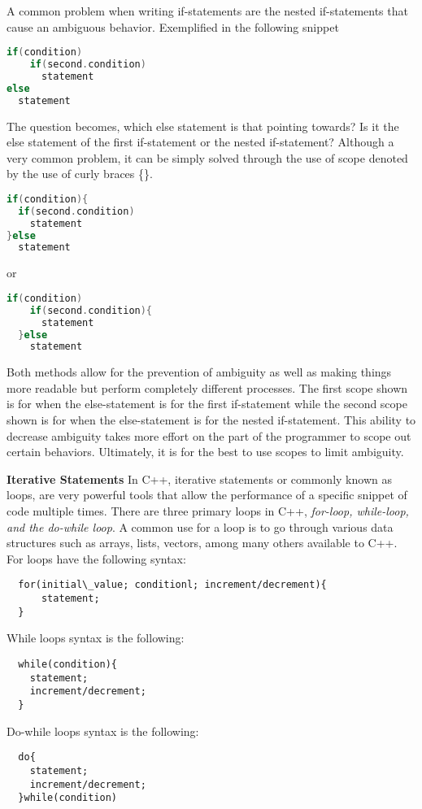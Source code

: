 \documentclass[12pt]{article}
\begin{document}
A common problem when writing if-statements are the nested if-statements that cause an ambiguous behavior. Exemplified in the following snippet
\begin{lstlisting}[language=C++]
  if(condition)
    if(second.condition)
      statement
else
  statement
\end{lstlisting}
The question becomes, which else statement is that pointing towards? Is it the else statement of the first if-statement or the nested if-statement? Although a very common problem, it can be simply solved through the use of scope denoted by the use of curly braces \{\}.
\begin{lstlisting}[language=C++]
if(condition){
  if(second.condition)
    statement
}else
  statement
\end{lstlisting}
or
\begin{lstlisting}[language=C++]
  if(condition)
    if(second.condition){
      statement
  }else
    statement
  \end{lstlisting}
Both methods allow for the prevention of ambiguity as well as making things more readable but perform completely different processes. The first scope shown is for when the else-statement is for the first if-statement while the second scope shown is for when the else-statement is for the nested if-statement. This ability to decrease ambiguity takes more effort on the part of the programmer to scope out certain behaviors. Ultimately, it is for the best to use scopes to limit ambiguity.

\textbf{Iterative Statements} In C++, iterative statements or commonly known as loops, are very powerful tools that allow the performance of a specific snippet of code multiple times. There are three primary loops in C++, \textit{for-loop, while-loop, and the do-while loop}. A common use for a loop is to go through various data structures such as arrays, lists, vectors, among many others available to C++. For loops have the following syntax:
\begin{lstlisting}
  for(initial\_value; conditionl; increment/decrement){
      statement;
  }
\end{lstlisting}
While loops syntax is the following:
\begin{lstlisting}
  while(condition){
    statement;
    increment/decrement;
  }
\end{lstlisting}
Do-while loops syntax is the following:
\begin{lstlisting}
  do{
    statement;
    increment/decrement;
  }while(condition)
\end{lstlisting}
\end{document}
